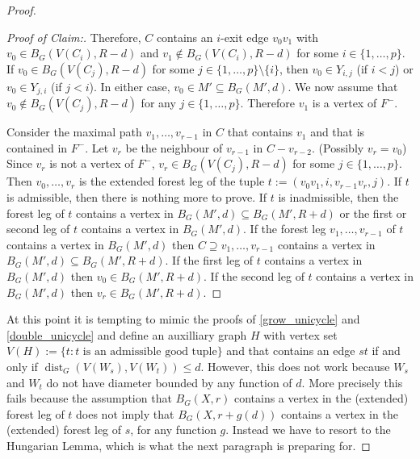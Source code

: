 \documentclass{patmorin}
\newenvironment{clmproof}{\begin{proof}[Proof of Claim:]\renewcommand{\qedsymbol}{\rule{1ex}{1ex}}}{\end{proof}}
\DeclareMathOperator{\dist}{dist}
\begin{document}
\begin{proof}
\begin{clmproof}
  Therefore, $C$ contains an $i$-exit edge $v_0v_1$ with $v_0\in B_G(V(C_i),R-d)$ and $v_1\notin B_G(V(C_i),R-d)$ for some $i\in\{1,\ldots,p\}$.  If $v_0\in B_G(V(C_j),R-d)$ for some $j\in\{1,\ldots,p\}\setminus\{i\}$, then $v_0\in Y_{i,j}$ (if $i< j$) or $v_0\in Y_{j,i}$ (if $j<i$).  In either case, $v_0\in M'\subseteq B_G(M',d)$.  We now assume that $v_0\notin B_G(V(C_j),R-d)$ for any $j\in\{1,\ldots,p\}$.  Therefore $v_1$ is a vertex of $F^-$.

  Consider the maximal path $v_1,\ldots,v_{r-1}$ in $C$ that contains $v_1$ and that is contained in $F^-$. Let $v_r$ be the neighbour of $v_{r-1}$ in $C-v_{r-2}$.  (Possibly $v_r=v_0$)  Since $v_r$ is not a vertex of $F^-$, $v_r\in B_G(V(C_j),R-d)$ for some $j\in\{1,\ldots,p\}$.  Then $v_0,\ldots,v_{r}$ is the extended forest leg of the tuple $t:=(v_0v_1,i,v_{r-1}v_r,j)$.   If $t$ is admissible, then there is nothing more to prove.  If $t$ is inadmissible, then the forest leg of $t$ contains a vertex in $B_G(M',d)\subseteq B_G(M',R+d)$ or the first or second leg of $t$ contains a vertex in $B_G(M',d)$.  If the forest leg $v_1,\ldots,v_{r-1}$ of $t$ contains a vertex in $B_G(M',d)$ then $C\supseteq v_1,\ldots,v_{r-1}$ contains a vertex in $B_G(M',d)\subseteq B_G(M',R+d)$.  If the first leg of $t$ contains a vertex in $B_G(M',d)$ then $v_0\in B_G(M',R+d)$.  If the second leg of $t$ contains a vertex in $B_G(M',d)$ then $v_r\in B_G(M',R+d)$.
\end{clmproof}

At this point it is tempting to mimic the proofs of \cref{grow_unicycle} and \cref{double_unicycle} and define an auxilliary graph $H$ with vertex set $V(H):=\{t:\textrm{$t$ is an admissible good tuple}\}$ and that contains an edge $st$ if and only if $\dist_G(V(W_s),V(W_t))\le d$. However, this does not work because $W_s$ and $W_t$ do not have diameter bounded by any function of $d$.  More precisely this fails because the assumption that $B_G(X,r)$ contains a vertex in the (extended) forest leg of $t$ does not imply that $B_G(X,r+g(d))$ contains a vertex in the (extended) forest leg of $s$, for any function $g$.  Instead we have to resort to the Hungarian Lemma, which is what the next paragraph is preparing for.



\end{proof}
\end{document}
